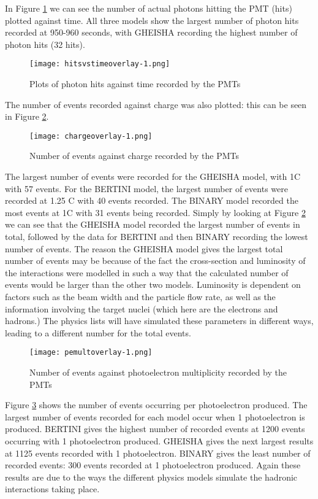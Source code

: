 \documentclass[11pt,oneside,a4paper]{article}
\begin{document}
In Figure \ref{fig:hitsvstime} we can see the number of actual photons hitting the PMT (hits) plotted against time. All three models show the largest number of photon hits recorded at 950-960 seconds, with GHEISHA recording the highest number of photon hits (32 hits).



\begin{figure}
	\centering
	\texttt{[image: hitsvstimeoverlay-1.png]}
	\caption{Plots of photon hits against time recorded by the PMTs}
	\label{fig:hitsvstime}
\end{figure}


The number of events recorded against charge was also plotted: this can be seen in Figure \ref{fig:chargevtime}.

\begin{figure}
	\centering
	\texttt{[image: chargeoverlay-1.png]}
	\caption{Number of events against charge recorded by the PMTs}
	\label{fig:chargevtime}
\end{figure}

The largest number of events were recorded for the GHEISHA model, with 1C with 57 events. For the BERTINI model, the largest number of events were recorded at 1.25 C with 40 events recorded. The BINARY model recorded the most events at 1C with 31 events being recorded. Simply by looking at Figure \ref{fig:chargevtime} we can see that the GHEISHA model recorded the largest number of events in total, followed by the data for BERTINI and then BINARY recording the lowest number of events. The reason the GHEISHA model gives the largest total number of events may be because of the fact the cross-section and luminosity of the interactions were modelled in such a way that the calculated number of events would be larger than the other two models. Luminosity is dependent on factors such as the beam width and the particle flow rate, as well as the information involving the target nuclei (which here are the electrons and hadrons.) The physics lists will have simulated these parameters in different ways, leading to a different number for the total events.

\begin{figure}
	\centering
	\texttt{[image: pemultoverlay-1.png]}
	\caption{Number of events against photoelectron multiplicity recorded by the PMTs}
	\label{fig:pemultvtime}
\end{figure}

Figure \ref{fig:pemultvtime} shows the number of events occurring per photoelectron produced. The largest number of events recorded for each model occur when 1 photoelectron is produced. BERTINI gives the highest number of recorded events at 1200 events occurring with 1 photoelectron produced. GHEISHA gives the next largest results at 1125 events recorded with 1 photoelectron. BINARY gives the least number of recorded events: 300 events recorded at 1 photoelectron produced. Again these results are due to the ways the different physics models simulate the hadronic interactions taking place.
\end{document}
